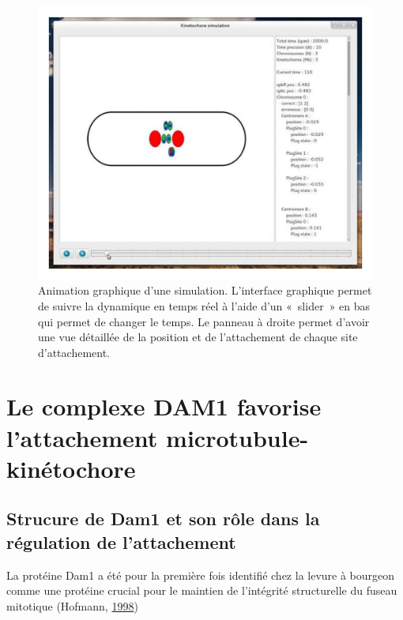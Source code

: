 \documentclass[12pt,a4paper,twoside,openright]{book}
\begin{document}
\begin{figure}[htbp]
\centering
\includegraphics{figures/annexes/gui.png}
\caption{\label{fig:kt-simul-gui}Animation graphique d'une simulation.
L'interface graphique permet de suivre la dynamique en temps réel à
l'aide d'un «~slider~» en bas qui permet de changer le temps. Le panneau
à droite permet d'avoir une vue détaillée de la position et de
l'attachement de chaque site d'attachement.}
\end{figure}

\cleardoublepage
\clearpage\null

\section{Le complexe DAM1 favorise l'attachement
microtubule-kinétochore}\label{le-complexe-dam1-favorise-lattachement-microtubule-kinuxe9tochore}

\label{sec:dam1}

\subsection{Strucure de Dam1 et son rôle dans la régulation de
l'attachement}\label{strucure-de-dam1-et-son-ruxf4le-dans-la-ruxe9gulation-de-lattachement}

La protéine Dam1 a été pour la première fois identifié chez la levure à
bourgeon comme une protéine crucial pour le maintien de l'intégrité
structurelle du fuseau mitotique (Hofmann,
\protect\hyperlink{ref-Hofmann1998}{1998})
\end{document}
